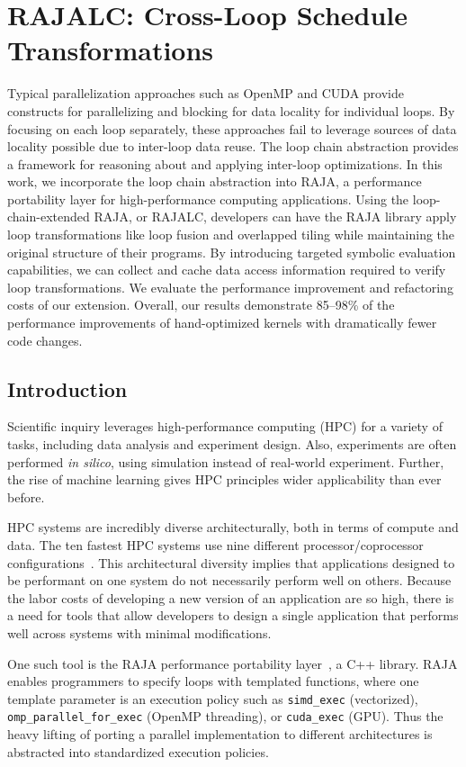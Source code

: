 \chapter{RAJALC: Cross-Loop Schedule Transformations}\label{chap:RAJALC}

Typical parallelization approaches such as OpenMP and CUDA provide constructs for parallelizing and blocking for data locality for individual loops.
By focusing on each loop separately, these approaches fail to leverage sources of data locality possible due to inter-loop data reuse.
The loop chain abstraction provides a framework for reasoning about and applying inter-loop optimizations.
In this work, we incorporate the loop chain abstraction into RAJA, a performance portability layer for high-performance computing applications.
Using the loop-chain-extended RAJA, or RAJALC, developers can have the RAJA library apply loop transformations like loop fusion and overlapped tiling while maintaining the original structure of their programs. 
By introducing targeted symbolic evaluation capabilities, we can collect and cache data access information required to verify loop transformations.
We evaluate the performance improvement and refactoring costs of our extension.
Overall, our results demonstrate 85--98\% of the performance improvements of hand-optimized kernels with dramatically fewer code changes.

\section{Introduction}
Scientific inquiry leverages high-performance computing (HPC) for a variety of
tasks, including data analysis and experiment design. 
Also, experiments are often performed \textit{in silico}, using 
simulation instead of real-world experiment.
Further, the rise of machine learning gives HPC principles wider
applicability than ever before.

HPC systems are incredibly diverse architecturally, 
both in terms of compute and data.
The ten fastest HPC systems use nine different processor/coprocessor
configurations~\cite{top500}.
This architectural diversity implies that applications designed to be
performant on one system do not necessarily perform well on others.
Because the labor costs of developing a new version of an application are so high, 
there is a need for tools that allow developers to design a single application
that performs well across systems with minimal modifications.

One such tool is the RAJA performance portability layer~\cite{hornung2014RAJA}, a C++ library.
RAJA enables programmers to specify loops with templated functions,
where one template parameter is an execution policy such as 
\verb.simd_exec. (vectorized), \verb.omp_parallel_for_exec. (OpenMP threading), or \verb.cuda_exec. (GPU).
Thus the heavy lifting of porting a parallel implementation to different 
architectures is abstracted into standardized execution policies.



